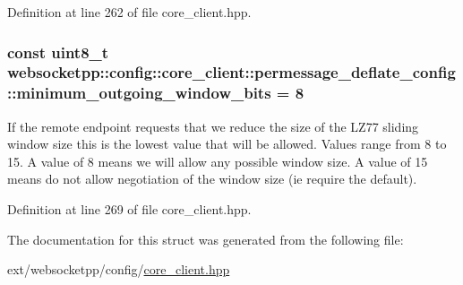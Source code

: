 Definition at line 262 of file core\+\_\+client.\+hpp.

\hypertarget{structwebsocketpp_1_1config_1_1core__client_1_1permessage__deflate__config_a0ac8d0ba3a5fcc0220cd282b2e18242c}{}
\subsubsection[{minimum\+\_\+outgoing\+\_\+window\+\_\+bits}]{\setlength{\rightskip}{0pt plus 5cm}const uint8\+\_\+t websocketpp\+::config\+::core\+\_\+client\+::permessage\+\_\+deflate\+\_\+config\+::minimum\+\_\+outgoing\+\_\+window\+\_\+bits = 8\hspace{0.3cm}{\ttfamily [static]}}\label{structwebsocketpp_1_1config_1_1core__client_1_1permessage__deflate__config_a0ac8d0ba3a5fcc0220cd282b2e18242c}
If the remote endpoint requests that we reduce the size of the L\+Z77 sliding window size this is the lowest value that will be allowed. Values range from 8 to 15. A value of 8 means we will allow any possible window size. A value of 15 means do not allow negotiation of the window size (ie require the default). 

Definition at line 269 of file core\+\_\+client.\+hpp.



The documentation for this struct was generated from the following file\+:\begin{DoxyCompactItemize}
\item 
ext/websocketpp/config/\hyperlink{core__client_8hpp}{core\+\_\+client.\+hpp}\end{DoxyCompactItemize}
